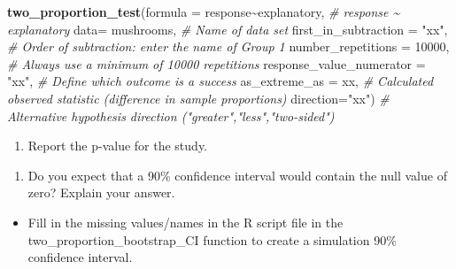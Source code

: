 \documentclass[
]{report}
\newenvironment{Shaded}{\begin{snugshade}}{\end{snugshade}}
\newcommand{\AttributeTok}[1]{\textcolor[rgb]{0.13,0.29,0.53}{#1}}
\newcommand{\CommentTok}[1]{\textcolor[rgb]{0.56,0.35,0.01}{\textit{#1}}}
\newcommand{\DecValTok}[1]{\textcolor[rgb]{0.00,0.00,0.81}{#1}}
\newcommand{\FunctionTok}[1]{\textcolor[rgb]{0.13,0.29,0.53}{\textbf{#1}}}
\newcommand{\NormalTok}[1]{#1}
\newcommand{\SpecialCharTok}[1]{\textcolor[rgb]{0.81,0.36,0.00}{\textbf{#1}}}
\newcommand{\StringTok}[1]{\textcolor[rgb]{0.31,0.60,0.02}{#1}}
\providecommand{\tightlist}{%
  \setlength{\itemsep}{0pt}\setlength{\parskip}{0pt}}
\begin{document}
\begin{Shaded}
\begin{Highlighting}[]
\FunctionTok{two\_proportion\_test}\NormalTok{(}\AttributeTok{formula =}\NormalTok{ response}\SpecialCharTok{\textasciitilde{}}\NormalTok{explanatory, }\CommentTok{\# response \textasciitilde{} explanatory}
    \AttributeTok{data=}\NormalTok{ mushrooms, }\CommentTok{\# Name of data set}
    \AttributeTok{first\_in\_subtraction =} \StringTok{"xx"}\NormalTok{, }\CommentTok{\# Order of subtraction: enter the name of Group 1}
    \AttributeTok{number\_repetitions =} \DecValTok{10000}\NormalTok{, }\CommentTok{\# Always use a minimum of 10000 repetitions}
    \AttributeTok{response\_value\_numerator =} \StringTok{"xx"}\NormalTok{, }\CommentTok{\# Define which outcome is a success }
    \AttributeTok{as\_extreme\_as =}\NormalTok{ xx, }\CommentTok{\# Calculated observed statistic (difference in sample proportions)}
    \AttributeTok{direction=}\StringTok{"xx"}\NormalTok{) }\CommentTok{\# Alternative hypothesis direction ("greater","less","two{-}sided")}
\end{Highlighting}
\end{Shaded}

\begin{enumerate}
\def\labelenumi{\arabic{enumi}.}
\setcounter{enumi}{7}
\tightlist
\item
  Report the p-value for the study.
\end{enumerate}

\vspace{0.2in}

\begin{enumerate}
\def\labelenumi{\arabic{enumi}.}
\setcounter{enumi}{8}
\tightlist
\item
  Do you expect that a 90\% confidence interval would contain the null value of zero? Explain your answer.
\end{enumerate}

\vspace{0.8in}

\begin{itemize}
\tightlist
\item
  Fill in the missing values/names in the R script file in the two\_proportion\_bootstrap\_CI function to create a simulation 90\% confidence interval.
\end{itemize}
\end{document}
